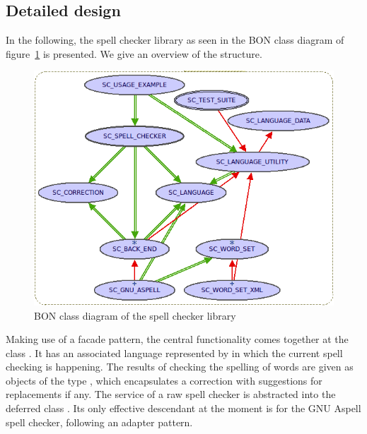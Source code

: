 \documentclass[paper=a4]{scrartcl}
\begin{document}




\subsection{Detailed design}

In the following, the spell checker library as seen in the BON class diagram of figure~\ref{Class diagram} is presented. We give an overview of the structure.

\begin{figure}
\centering
\includegraphics[width=\textwidth]{object_model.png}
\caption{BON class diagram of the spell checker library}
\label{Class diagram}
\end{figure}

Making use of a facade pattern, the central functionality comes together at the class . It has an associated language represented by  in which the current spell checking is happening. The results of checking the spelling of words are given as objects of the type , which encapsulates a correction with suggestions for replacements if any. The service of a raw spell checker is abstracted into the deferred class . Its only effective descendant at the moment is  for the GNU Aspell spell checker, following an adapter pattern.
\end{document}
